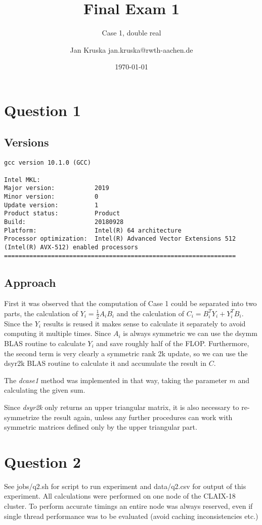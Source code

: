 \documentclass{scrartcl}
\title{Final Exam 1}
\subtitle{Case 1, double real}
\author{Jan Kruska jan.kruska@rwth-aachen.de}
\date{\today}
\begin{document}
\maketitle


\section{Question 1}
\subsection{Versions}
\begin{verbatim}
gcc version 10.1.0 (GCC)

Intel MKL:
Major version:           2019
Minor version:           0
Update version:          1
Product status:          Product
Build:                   20180928
Platform:                Intel(R) 64 architecture
Processor optimization:  Intel(R) Advanced Vector Extensions 512 (Intel(R) AVX-512) enabled processors
================================================================
\end{verbatim}

\subsection{Approach}

First it was observed that the computation of Case 1 could be separated into two parts, the calculation of $Y_i = \frac{1}{2}A_iB_i$ and the calculation of $C_i = B_i^TY_i + Y_i^TB_i$.
Since the $Y_i$ results is reused it makes sense to calculate it separately to avoid computing it multiple times.
Since $A_i$ is always symmetric we can use the dsymm BLAS routine to calculate $Y_i$ and save roughly half of the FLOP.
Furthermore, the second term is very clearly a symmetric rank 2k update, so we can use the dsyr2k BLAS routine to calculate it and accumulate the result in $C$.

The \emph{dcase1} method was implemented in that way, taking the parameter $m$ and calculating the given sum.

Since \emph{dsyr2k} only returns an upper triangular matrix, it is also necessary to re-symmetrize the result again, unless any further procedures can work with symmetric matrices defined only by the upper triangular part.

\section{Question 2}
See jobs/q2.sh for script to run experiment and data/q2.csv for output of this experiment.
All calculations were performed on one node of the CLAIX-18 cluster.
To perform accurate timings an entire node was always reserved, even if single thread performance was to be evaluated (avoid caching inconsistencies etc.)
\end{document}
